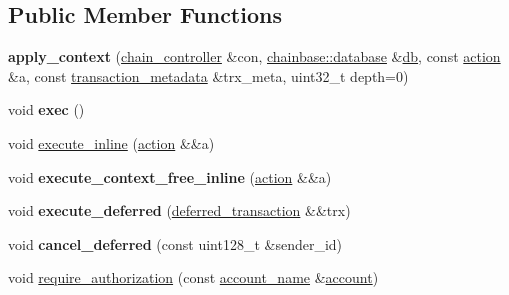\subsection*{Public Member Functions}
\begin{DoxyCompactItemize}
\item 
\mbox{\label{classaacio_1_1chain_1_1apply__context_a20c3b169fd8f64579c37d0ae1d04b700}} 
{\bfseries apply\+\_\+context} (\mbox{\hyperlink{classaacio_1_1chain_1_1chain__controller}{chain\+\_\+controller}} \&con, \mbox{\hyperlink{classchainbase_1_1database}{chainbase\+::database}} \&\mbox{\hyperlink{classaacio_1_1chain_1_1apply__context_ac3ce744211cc971332014680f272ff58}{db}}, const \mbox{\hyperlink{structaacio_1_1chain_1_1action}{action}} \&a, const \mbox{\hyperlink{classaacio_1_1chain_1_1transaction__metadata}{transaction\+\_\+metadata}} \&trx\+\_\+meta, uint32\+\_\+t depth=0)
\item 
\mbox{\label{classaacio_1_1chain_1_1apply__context_a529da4e02bbf6c75ab203abf55914298}} 
void {\bfseries exec} ()
\item 
void \mbox{\hyperlink{classaacio_1_1chain_1_1apply__context_a22d5637eb5acab5710dedd675b066984}{execute\+\_\+inline}} (\mbox{\hyperlink{structaacio_1_1chain_1_1action}{action}} \&\&a)
\item 
\mbox{\label{classaacio_1_1chain_1_1apply__context_a7811cac1c2199aab6bd637482ba8c5e0}} 
void {\bfseries execute\+\_\+context\+\_\+free\+\_\+inline} (\mbox{\hyperlink{structaacio_1_1chain_1_1action}{action}} \&\&a)
\item 
\mbox{\label{classaacio_1_1chain_1_1apply__context_a222255a1c504596e64a49155087f3811}} 
void {\bfseries execute\+\_\+deferred} (\mbox{\hyperlink{structaacio_1_1chain_1_1deferred__transaction}{deferred\+\_\+transaction}} \&\&trx)
\item 
\mbox{\label{classaacio_1_1chain_1_1apply__context_a11f06e70623fc052bd0e194e7755e219}} 
void {\bfseries cancel\+\_\+deferred} (const uint128\+\_\+t \&sender\+\_\+id)
\item 
void \mbox{\hyperlink{classaacio_1_1chain_1_1apply__context_accd533bc0e7a40ae398ecad8cee6d64c}{require\+\_\+authorization}} (const \mbox{\hyperlink{structaacio_1_1chain_1_1name}{account\+\_\+name}} \&\mbox{\hyperlink{structaccount}{account}})

\end{DoxyCompactItemize}
